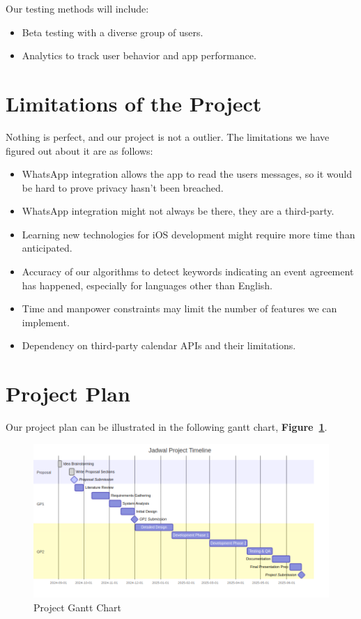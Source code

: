 \documentclass[12pt,a4paper]{article}
\begin{document}
Our testing methods will include:
\begin{itemize}
    \item Beta testing with a diverse group of users.
    \item Analytics to track user behavior and app performance.
\end{itemize}

\section{Limitations of the Project}

Nothing is perfect, and our project is not a outlier. The limitations we have figured out about it are as follows:

\begin{itemize}
    \item WhatsApp integration allows the app to read the users messages, so it would be hard to prove privacy hasn't been breached.
    \item WhatsApp integration might not always be there, they are a third-party.
    \item Learning new technologies for iOS development might require more time than anticipated.
    \item Accuracy of our algorithms to detect keywords indicating an event agreement has happened, especially for languages other than English.
    \item Time and manpower constraints may limit the number of features we can implement.
    \item Dependency on third-party calendar APIs and their limitations.
\end{itemize}

\section{Project Plan}

Our project plan can be illustrated in the following gantt chart, \textbf{Figure~\ref{fig:project-gantt-chart}}.

\begin{figure}[!h]
    \centering
    \includegraphics[width=\textwidth]{images/gantt.png}
    \caption{Project Gantt Chart}
    \label{fig:project-gantt-chart}
\end{figure}
\end{document}
